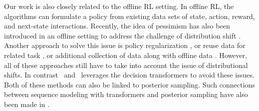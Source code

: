Our work is also closely related to the offline RL setting. In offline RL, the algorithms can formulate a policy from existing data sets of state, action, reward, and next-state interactions.
%
Recently, the idea of pessimism has also been introduced in an offline setting to address the challenge of distribution shift \citep{kumar2020conservative, yu2021combo, liu2020provably, ghasemipour2022so}. Another approach to solve this issue is policy regularization \citep{fujimoto2019off, kumar2019stabilizing, wu2019behavior, siegel2020keep, liu2019off}, or reuse data for related task \citep{li2020focal, mitchell2021offline}, or additional collection of data along with offline data \citep{pong2022offline}. However, all of these approaches still have to take into account the issue of distributional shifts. In contrast \pred\ and \dptg\ leverages the decision transformers to avoid these issues.
%
Both of these methods can also be linked to posterior sampling. Such connections between sequence modeling with transformers and posterior sampling have also been made in \citet{chen2021decision,muller2021transformers,lee2023supervised, yang2023bayesian}.
